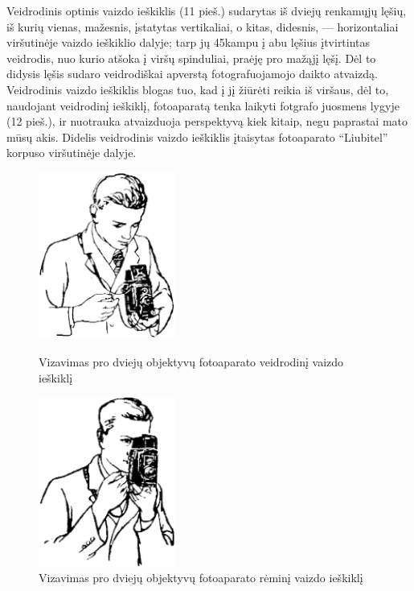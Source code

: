 \documentclass[12pt]{book}
\begin{document}
					Veidrodinis optinis vaizdo ieškiklis (11 pieš.) sudarytas iš dviejų renkamųjų lęšių, iš kurių vienas, mažesnis, įstatytas vertikaliai, o kitas, didesnis, --- horizontaliai viršutinėje vaizdo ieškiklio dalyje; tarp jų 45\degree kampu į abu lęšius įtvirtintas veidrodis, nuo kurio atšoka į viršų spinduliai, praėję pro mažąjį lęšį.
					Dėl to didysis lęšis sudaro veidrodiškai apverstą fotografuojamojo daikto atvaizdą. Veidrodinis vaizdo ieškiklis blogas tuo, kad į jį žiūrėti reikia iš viršaus, dėl to, naudojant veidrodinį ieškiklį, fotoaparatą tenka laikyti fotgrafo juosmens lygyje (12 pieš.), ir nuotrauka atvaizduoja perspektyvą kiek kitaip, negu paprastai mato mūsų akis. Didelis veidrodinis vaizdo ieškiklis įtaisytas fotoaparato ``Liubitel'' korpuso viršutinėje dalyje.
					\begin{figure}[h]
						\centering
						\begin{minipage}[t]{0.4\textwidth}
							\includegraphics[width=0.4\textwidth]{12-pav}
							\caption{Vizavimas pro dviejų objektyvų fotoaparato veidrodinį vaizdo ieškiklį}
							\label{fig:12}
						\end{minipage}
						\hfill
						\begin{minipage}[t]{0.4\textwidth}
							\includegraphics[width=0.4\textwidth]{13-pav}
							\caption{Vizavimas pro dviejų objektyvų fotoaparato rėminį vaizdo ieškiklį}
							\label{fig:13}
						\end{minipage}
					\end{figure}
\end{document}
